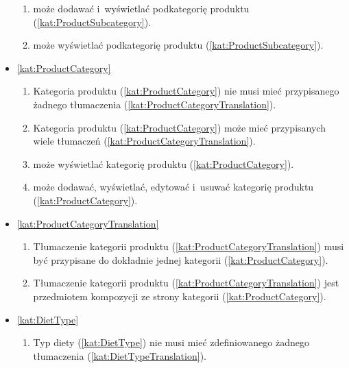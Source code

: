 \begin{itemize}[label={\textbf{Reguły dla}}, wide, labelwidth=!, labelindent=0pt]
\begin{enumerate}[label={\textbf{REG/2/\protect\twodigits{\arabic{enumi}}}}, wide, labelwidth=!, align=left, leftmargin=3cm, resume]
        \item {} może dodawać i~wyświetlać podkategorię produktu (\ref{kat:ProductSubcategory}).
        \item {} może wyświetlać podkategorię produktu (\ref{kat:ProductSubcategory}).
    \end{enumerate}
    \item\ref{kat:ProductCategory}\mynobreakpar
    \begin{enumerate}[label={\textbf{REG/2/\protect\twodigits{\arabic{enumi}}}}, wide, labelwidth=!, align=left, leftmargin=3cm, resume]
        \item Kategoria produktu (\ref{kat:ProductCategory}) nie musi mieć przypisanego żadnego tłumaczenia (\ref{kat:ProductCategoryTranslation}).
        \item Kategoria produktu (\ref{kat:ProductCategory}) może mieć przypisanych wiele tłumaczeń (\ref{kat:ProductCategoryTranslation}).
        \item {} może wyświetlać kategorię produktu (\ref{kat:ProductCategory}).
        \item {} może dodawać, wyświetlać, edytować i~usuwać kategorię produktu (\ref{kat:ProductCategory}).
    \end{enumerate}
    \item\ref{kat:ProductCategoryTranslation}\mynobreakpar
    \begin{enumerate}[label={\textbf{REG/2/\protect\twodigits{\arabic{enumi}}}}, wide, labelwidth=!, align=left, leftmargin=3cm, resume]
        \item Tłumaczenie kategorii produktu (\ref{kat:ProductCategoryTranslation}) musi być przypisane do dokładnie jednej kategorii (\ref{kat:ProductCategory}).
        \item Tłumaczenie kategorii produktu (\ref{kat:ProductCategoryTranslation}) jest przedmiotem kompozycji ze strony kategorii (\ref{kat:ProductCategory}).
    \end{enumerate}
    \item\ref{kat:DietType}\mynobreakpar
    \begin{enumerate}[label={\textbf{REG/2/\protect\twodigits{\arabic{enumi}}}}, wide, labelwidth=!, align=left, leftmargin=3cm, resume]
        \item Typ diety (\ref{kat:DietType}) nie musi mieć zdefiniowanego żadnego tłumaczenia (\ref{kat:DietTypeTranslation}).

\end{enumerate}
\end{itemize}
